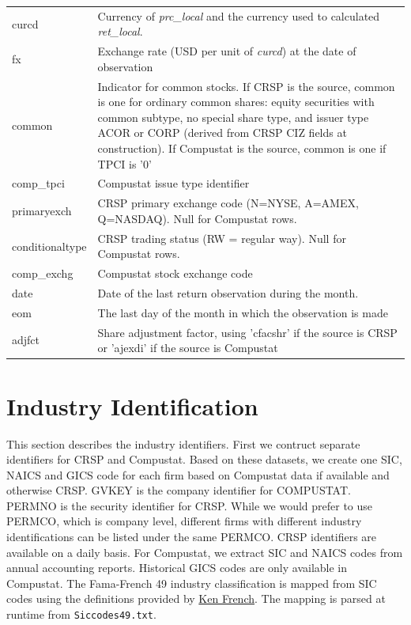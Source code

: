 \documentclass[12pt,title,fleqn]{article}
\begin{document}
{\begin{longtable}{@{\extracolsep{\fill}}|l|m{14.2cm}|@{}}
		curcd & Currency of \textit{prc\_local} and the currency used to calculated \textit{ret\_local}. \\[1ex]
		
		fx & Exchange rate (USD per unit of \textit{curcd}) at the date of observation\\[1ex]
		
		common & Indicator for common stocks. If CRSP is the source, common is one for ordinary common shares: equity securities with common subtype, no special share type, and issuer type ACOR or CORP (derived from CRSP CIZ fields at construction). If Compustat is the source, common is one if TPCI is '0'  \\[1ex]
		
		comp\_tpci & Compustat issue type identifier \\[1ex]
		
		primaryexch & CRSP primary exchange code (N=NYSE, A=AMEX, Q=NASDAQ). Null for Compustat rows. \\[1ex]
		
		conditionaltype & CRSP trading status (RW = regular way). Null for Compustat rows. \\[1ex]
		
		comp\_exchg & Compustat stock exchange code \\[1ex]
		
		date & Date of the last return observation during the month. \\[1ex]
		
		eom & The last day of the month in which the observation is made\\[1ex]
		
		adjfct & Share adjustment factor, using 'cfacshr' if the source is CRSP or 'ajexdi' if the source is Compustat \\
	
\end{longtable}
}

\section{Industry Identification}
    This section describes the industry identifiers. First we contruct separate identifiers for CRSP and Compustat. Based on these datasets, we create one SIC, NAICS and GICS code for each firm based on Compustat data if available and otherwise CRSP. GVKEY is the company identifier for COMPUSTAT. PERMNO is the security identifier for CRSP. While we would prefer to use PERMCO, which is company level, different firms with different industry identifications can be listed under the same PERMCO. CRSP identifiers are available on a daily basis. For Compustat, we extract SIC and NAICS codes from annual accounting reports. Historical GICS codes are only available in Compustat. The Fama-French 49 industry classification is mapped from SIC codes using the definitions provided by \href{https://mba.tuck.dartmouth.edu/pages/faculty/ken.french/Data_Library/det_49_ind_port.html}{Ken French}. The mapping is parsed at runtime from \texttt{Siccodes49.txt}.
\end{document}
